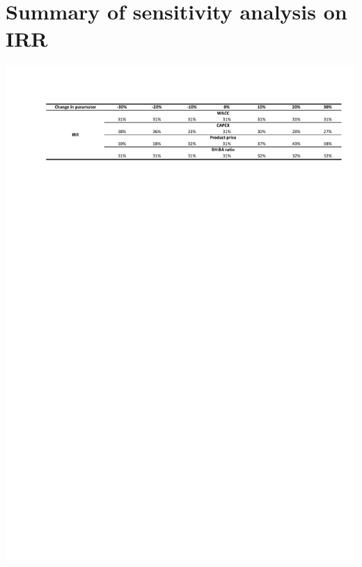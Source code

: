 \section{Summary of sensitivity analysis on IRR}
\label{app:irr-sensitivity}

\begin{table}[H]
    \centering
    \includegraphics[clip, trim = 1cm 15cm 1cm 1cm, width=\linewidth]{chapters/6-economics/figures/sensitivity1.pdf}
    \label{tab:de-proscons}
\end{table}

